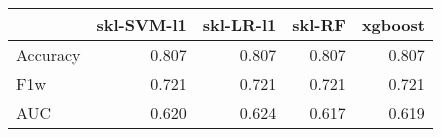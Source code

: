 \begin{tabular}{lrrrr}
\toprule
{} &  skl-SVM-l1 &  skl-LR-l1 &  skl-RF &  xgboost \\
\midrule
Accuracy &       0.807 &      0.807 &   0.807 &    0.807 \\
F1w      &       0.721 &      0.721 &   0.721 &    0.721 \\
AUC      &       0.620 &      0.624 &   0.617 &    0.619 \\
\bottomrule
\end{tabular}
